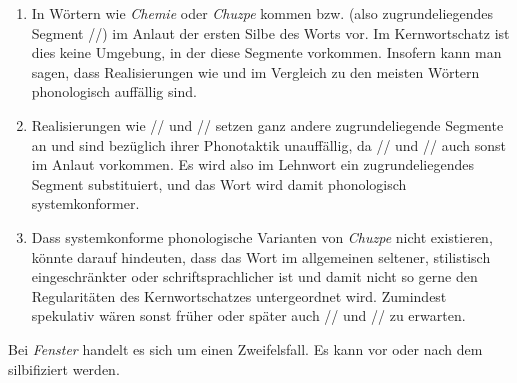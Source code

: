 \begin{enumerate}\Lf
  \item In Wörtern wie \textit{Chemie} oder \textit{Chuzpe} kommen \textipa{[\c{c}]} bzw. \textipa{[X]} (also zugrundeliegendes Segment //) im Anlaut der ersten Silbe des Worts vor.
    Im Kernwortschatz ist dies keine Umgebung, in der diese Segmente vorkommen.
    Insofern kann man sagen, dass Realisierungen wie \textipa{[XU\t{ts}p@]} und \textipa{[\c{c}emi:]} im Vergleich zu den meisten Wörtern phonologisch auffällig sind.
  \item Realisierungen wie // und // setzen ganz andere zugrundeliegende Segmente an und sind bezüglich ihrer Phonotaktik unauffällig, da // und // auch sonst im Anlaut vorkommen.
    Es wird also im Lehnwort ein zugrundeliegendes Segment substituiert, und das Wort wird damit phonologisch systemkonformer.
  \item Dass systemkonforme phonologische Varianten von \textit{Chuzpe} nicht existieren, könnte darauf hindeuten, dass das Wort im allgemeinen seltener, stilistisch eingeschränkter oder schriftsprachlicher ist und damit nicht so gerne den Regularitäten des Kernwortschatzes untergeordnet wird.
    Zumindest spekulativ wären sonst früher oder später auch // und // zu erwarten.
\end{enumerate}


Bei \textit{Fenster} handelt es sich um einen Zweifelsfall.
Es kann vor oder nach dem \textipa{[s]} silbifiziert werden.

